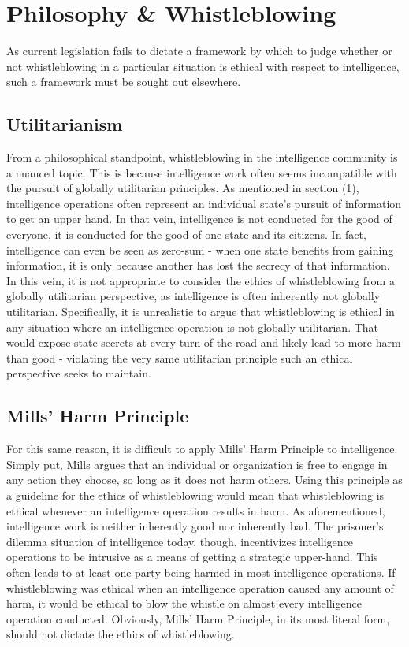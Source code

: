\documentclass [12 pt] {article}
\begin{document}
\section{Philosophy \& Whistleblowing}
As current legislation fails to dictate a framework by which to judge whether or not whistleblowing in a particular situation is ethical with respect to intelligence, such a framework must be sought out elsewhere.  
\subsection {Utilitarianism}
From a philosophical standpoint, whistleblowing in the intelligence community is a nuanced topic. This is because intelligence work often seems incompatible with the pursuit of globally utilitarian principles. As mentioned in section (1), intelligence operations often represent an individual state's pursuit of information to get an upper hand. In that vein, intelligence is not conducted for the good of everyone, it is conducted for the good of one state and its citizens. In fact, intelligence can even be seen as zero-sum - when one state benefits from gaining information, it is only because another has lost the secrecy of that information. In this vein, it is not appropriate to consider the ethics of whistleblowing from a globally utilitarian perspective, as intelligence is often inherently not globally utilitarian. Specifically, it is unrealistic to argue that whistleblowing is ethical in any situation where an intelligence operation is not globally utilitarian. That would expose state secrets at every turn of the road and likely lead to more harm than good - violating the very same utilitarian principle such an ethical perspective seeks to maintain.
\subsection{Mills' Harm Principle}
For this same reason, it is difficult to apply Mills' Harm Principle to intelligence. Simply put, Mills argues that an individual or organization is free to engage in any action they choose, so long as it does not harm others. Using this principle as a guideline for the ethics of whistleblowing would mean that whistleblowing is ethical whenever an intelligence operation results in harm. As aforementioned, intelligence work is neither inherently good nor inherently bad. The prisoner's dilemma situation of intelligence today, though, incentivizes intelligence operations to be intrusive as a means of getting a strategic upper-hand. This often leads to at least one party being harmed in most intelligence operations. If whistleblowing was ethical when an intelligence operation caused any amount of harm, it would be ethical to blow the whistle on almost every intelligence operation conducted. Obviously, Mills' Harm Principle, in its most literal form, should not dictate the ethics of whistleblowing.
\end{document}
